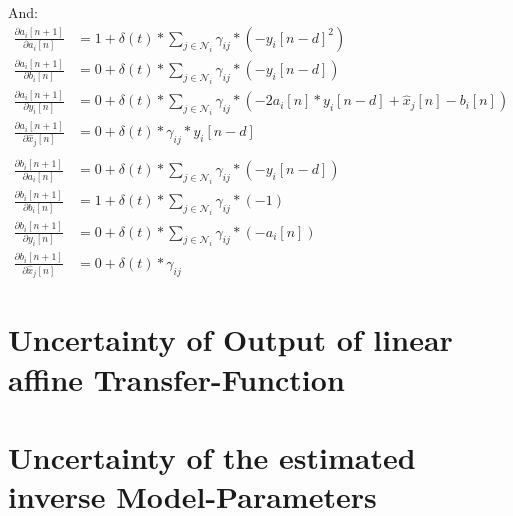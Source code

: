\documentclass[10pt,a4paper,onecolumn]{article}
\begin{document}
    And:
    \begin{align}
        \frac{\partial a_i[n+1]}{\partial a_i[n]} &= 1 + \delta(t) * \sum_{j \in \mathcal{N}_i} \gamma_{ij} * (- {y_i}[n-d]^2) \\
        \frac{\partial a_i[n+1]}{\partial b_i[n]} &= 0 + \delta(t) * \sum_{j \in \mathcal{N}_i} \gamma_{ij} * (- y_i[n-d]) \\
        \frac{\partial a_i[n+1]}{\partial y_i[n]} &= 0 + \delta(t) * \sum_{j \in \mathcal{N}_i} \gamma_{ij} * (-2 a_i[n] * y_i[n-d] + \hat{x}_j[n] - b_i[n]) \\
        \frac{\partial a_i[n+1]}{\partial \hat{x}_j[n]} &= 0 + \delta(t) * \gamma_{ij} * y_i[n-d]\\
        \nonumber\\
        \frac{\partial b_i[n+1]}{\partial a_i[n]} &= 0 + \delta(t) * \sum_{j \in \mathcal{N}_i} \gamma_{ij} * (- y_i[n-d]) \\
        \frac{\partial b_i[n+1]}{\partial b_i[n]} &= 1 + \delta(t) * \sum_{j \in \mathcal{N}_i} \gamma_{ij} * (- 1) \\
        \frac{\partial b_i[n+1]}{\partial y_i[n]} &= 0 + \delta(t) * \sum_{j \in \mathcal{N}_i} \gamma_{ij} * (- a_i[n]) \\
        \frac{\partial b_i[n+1]}{\partial \hat{x}_j[n]} &= 0 + \delta(t) * \gamma_{ij}
    \end{align}
    
    
    
    
    \section{Uncertainty of Output of linear affine Transfer-Function}
    
    \section{Uncertainty of the estimated inverse Model-Parameters}
    
\end{document}
